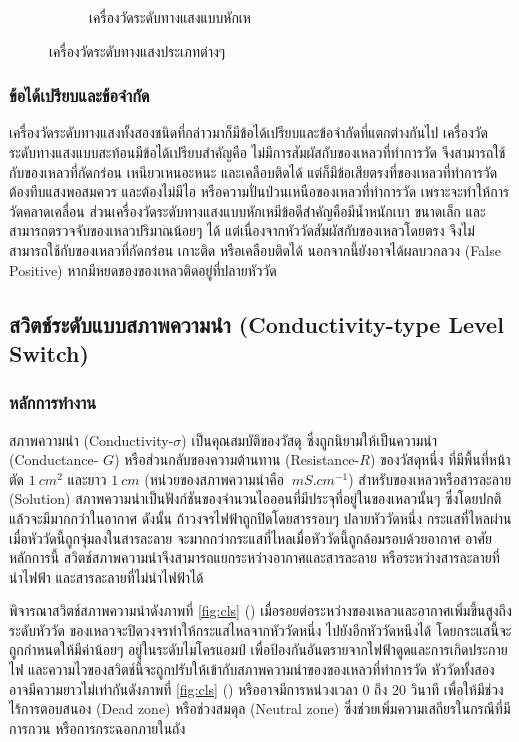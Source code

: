 \documentclass[final,11pt,a4paper]{article}
\begin{document}
\begin{figure}
\begin{subfigure}[b]{0.35\textwidth}
        \caption{เครื่องวัดระดับทางแสงแบบหักเห}
        \label{fig:ols2}
    \end{subfigure}
    \hfill
    \caption{เครื่องวัดระดับทางแสงประเภทต่างๆ}
    \label{fig:ols}
\end{figure}


\subsubsection{ข้อได้เปรียบและข้อจำกัด}
เครื่องวัดระดับทางแสงทั้งสองชนิดที่กล่าวมาก็มีข้อได้เปรียบและข้อจำกัดที่แตกต่างกันไป เครื่องวัดระดับทางแสงแบบสะท้อนมีข้อได้เปรียบสำคัญคือ
ไม่มีการสัมผัสกับของเหลวที่ทำการวัด จึงสามารถใช้กับของเหลวที่กัดกร่อน เหนียวเหนอะหนะ และเคลือบติดได้ แต่ก็มีข้อเสียตรงที่ของเหลวที่ทำการวัดต้องทึบแสงพอสมควร
และต้องไม่มีไอ หรือความปั่นป่วนเหนือของเหลวที่ทำการวัด เพราะจะทำให้การวัดคลาดเคลื่อน ส่วนเครื่องวัดระดับทางแสงแบบหักเหมีข้อดีสำคัญคือมีน้ำหนักเบา ขนาดเล็ก
และสามารถตรวจจับของเหลวปริมาณน้อยๆ ได้ แต่เนื่องจากหัววัดสัมผัสกับของเหลวโดยตรง จึงไม่สามารถใช้กับของเหลวที่กัดกร่อน เกาะติด หรือเคลือบติดได้ 
นอกจากนี้ยังอาจได้ผลบวกลวง (False Positive) หากมีหยดของของเหลวติดอยู่ที่ปลายหัววัด



\subsection{สวิตช์ระดับแบบสภาพความนำ (Conductivity-type Level Switch)}
\subsubsection{หลักการทำงาน}
สภาพความนำ (Conductivity-$\sigma$) เป็นคุณสมบัติของวัสดุ ซึ่งถูกนิยามให้เป็นความนำ (Conductance- $G$) 
หรือส่วนกลับของความต้านทาน (Resistance-$R$) ของวัสดุหนึ่ง ที่มีพื้นที่หน้าตัด $\SI{1}{cm^2}$ และยาว $\SI{1}{cm}$ 
(หน่วยของสภาพความนำคือ $\SI{}{mS.cm^{-1}}$) สำหรับของเหลวหรือสารละลาย (Solution) 
สภาพความนำเป็นฟังก์ชันของจำนวนไอออนที่มีประจุที่อยู่ในของเหลวนั้นๆ ซึ่งโดยปกติแล้วจะมีมากกว่าในอากาศ ดังนั้น 
ถ้าวงจรไฟฟ้าถูกปิดโดยสารรอบๆ ปลายหัววัดหนึ่ง กระแสที่ไหลผ่านเมื่อหัววัดนี้ถูกจุ่มลงในสารละลาย จะมากกว่ากระแสที่ไหลเมื่อหัววัดนี้ถูกล้อมรอบด้วยอากาศ
อาศัยหลักการนี้ สวิตช์สภาพความนำจึงสามารถแยกระหว่างอากาศและสารละลาย หรือระหว่างสารละลายที่นำไฟฟ้า และสารละลายที่ไม่นำไฟฟ้าได้ 

พิจารณาสวิตช์สภาพความนำดังภาพที่ \ref{fig:cls} () เมื่อรอยต่อระหว่างของเหลวและอากาศเพิ่มขึ้นสูงถึงระดับหัววัด ของเหลวจะปิดวงจรทำให้กระแสไหลจากหัววัดหนึ่ง
ไปยังอีกหัววัดหนึงได้ โดยกระแสนี้จะถูกกำหนดให้มีค่าน้อยๆ อยู่ในระดับไมโครแอมป์ เพื่อป้องกันอันตรายจากไฟฟ้าดูดและการเกิดประกายไฟ 
และความไวของสวิตช์นี้จะถูกปรับให้เข้ากับสภาพความนำของของเหลวที่ทำการวัด หัววัดทั้งสองอาจมีความยาวไม่เท่ากันดังภาพที่ \ref{fig:cls} () หรืออาจมีการหน่วงเวลา 0 ถึง 20 วินาที 
เพื่อให้มีช่วงไร้การตอบสนอง (Dead zone) หรือช่วงสมดุล (Neutral zone) ซึ่งช่วยเพิ่มความเสถียรในกรณีที่มีการกวน หรือการกระฉอกภายในถัง 
\end{document}
